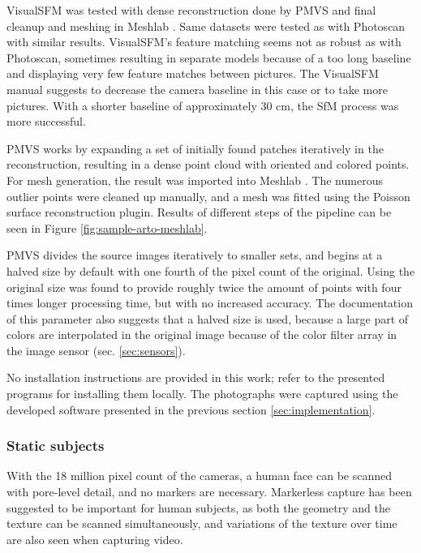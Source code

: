 VisualSFM \cite{visualsfm} was tested with dense reconstruction done by PMVS \cite{pmvs} and final cleanup and meshing in Meshlab \cite{meshlab}.
Same datasets were tested as with Photoscan with similar results.
VisualSFM's feature matching seems not as robust as with Photoscan, sometimes resulting in separate models because of a too long baseline and displaying very few feature matches between pictures.
The VisualSFM manual suggests to decrease the camera baseline in this case or to take more pictures.
With a shorter baseline of approximately 30 cm, the SfM process was more successful.

PMVS \cite{pmvs} works by expanding a set of initially found patches iteratively in the reconstruction, resulting in a dense point cloud with oriented and colored points.
For mesh generation, the result was imported into Meshlab \cite{meshlab}.
The numerous outlier points were cleaned up manually, and a mesh was fitted using the Poisson surface reconstruction plugin.
Results of different steps of the pipeline can be seen in Figure \ref{fig:sample-arto-meshlab}.

PMVS divides the source images iteratively to smaller sets, and begins at a halved size by default with one fourth of the pixel count of the original.
Using the original size was found to provide roughly twice the amount of points with four times longer processing time, but with no increased accuracy.
The documentation of this parameter also suggests that a halved size is used, because a large part of colors are interpolated in the original image because of the color filter array in the image sensor (sec. \ref{sec:sensors}).

No installation instructions are provided in this work; refer to the presented programs for installing them locally.
The photographs were captured using the developed software presented in the previous section \ref{sec:implementation}.

\subsubsection{Static subjects}

With the 18 million pixel count of the cameras, a human face can be scanned with pore-level detail, and no markers are necessary.
Markerless capture has been suggested to be important for human subjects, as both the geometry and the texture can be scanned simultaneously, and variations of the texture over time are also seen when capturing video. \cite{bradley?}

